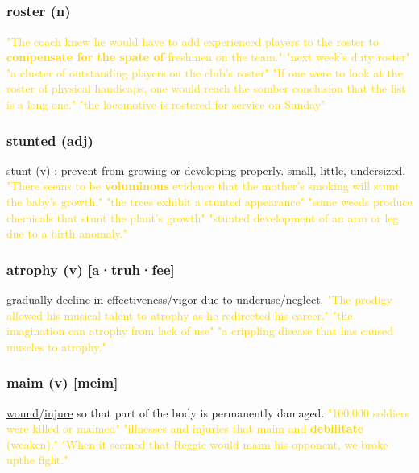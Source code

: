 \documentclass{proc}
\begin{document}
	\newpage
	\setcounter{section}{43}
	\setcounter{subsection}{0}
	
	
	\subsection{}
	\subsubsection{\textcolor{brickred}{roster} (n)}
	\textcolor{gold}{"The coach knew he would have to add experienced players to the roster to \textbf{compensate for the spate of} freshmen on the team." "next week's duty roster" "a cluster of outstanding players on the club's roster" "If one were to look at the roster of physical handicaps, one would reach the somber conclusion that  the list is a long one." "the locomotive is rostered for service on Sunday"}
	
	\subsubsection{\textcolor{brickred}{stunted} (adj)}
	stunt (v) : prevent from growing or developing properly. small, little, undersized.
	\textcolor{gold}{"There seems to be \textbf{voluminous} evidence that the mother's smoking will stunt the baby's growth." "the trees exhibit a stunted appearance" "some weeds produce chemicals that stunt the plant's growth" "stunted development of an arm or leg due to a  birth anomaly."}
	
	\subsubsection{\textcolor{brickred}{atrophy} (v) [a·truh·fee]}
	gradually decline in effectiveness/vigor due to underuse/neglect.
	\textcolor{gold}{"The prodigy allowed his musical talent to atrophy as he redirected his career." "the imagination can atrophy from lack of use" "a crippling disease that has caused muscles to atrophy."}
	
	\subsubsection{\textcolor{brickred}{maim} (v) [meim]}
	\underline{wound}/\underline{injure} so that part of the body is permanently damaged.
	\textcolor{gold}{"100,000 soldiers were killed or maimed" "illnesses and injuries that maim and \textbf{debilitate} (weaken)." "When it seemed that Reggie would maim his opponent, we broke upthe fight."}
	
\end{document}
